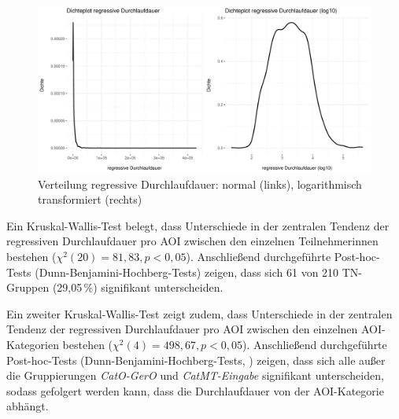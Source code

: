 



\begin{figure}
    \includegraphics[width=\textwidth]{Figures/EyeTracking/CatDe/ggplot_catde-RegPD_density_de}
	\caption{Verteilung regressive Durchlaufdauer: normal (links), logarithmisch transformiert (rechts)}
	\label{K6:fig:CatDe:density-iaregpd}
\end{figure}


\begin{sloppypar}
Ein Kruskal-Wallis-Test belegt, dass Unterschiede in der zentralen Tendenz der regressiven Durchlaufdauer pro AOI zwischen den einzelnen Teilnehmer{\textperiodcentered}innen bestehen ($\chi^2(20) = 81,83, p < 0,05$). Anschließend durchgeführte Post-hoc-Tests (Dunn-Benjamini-Hochberg-Tests) zeigen, dass sich 61 von 210 TN-Gruppen (29,05\,\%) signifikant unterscheiden.
\end{sloppypar}

Ein zweiter Kruskal-Wallis-Test zeigt zudem, dass Unterschiede in der zentralen Tendenz der regressiven Durchlaufdauer pro AOI zwischen den einzelnen AOI-Kategorien bestehen ($\chi^2(4) = 498,67, p < 0,05$). Anschließend durchgeführte Post-hoc-Tests (Dunn-Benjamini-Hochberg-Tests, ) zeigen, dass sich alle außer die Gruppierungen \emph{CatO-GerO} und \emph{CatMT-Eingabe} signifikant unterscheiden, sodass gefolgert werden kann, dass die Durchlaufdauer von der AOI-Kategorie abhängt.

